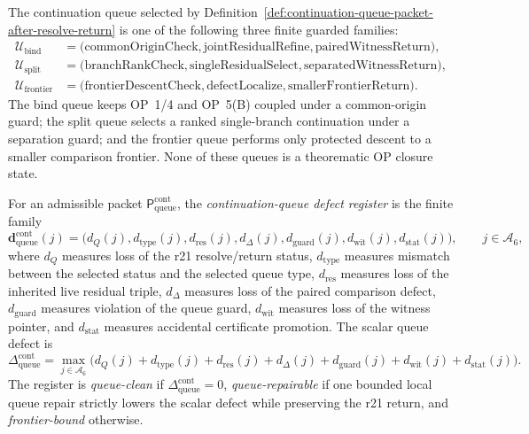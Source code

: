 \begin{definition}
\label{def:bind-split-frontier-continuation-queues}
The continuation queue selected by Definition~\ref{def:continuation-queue-packet-after-resolve-return} is one of the following three finite guarded families:
\[
\begin{aligned}
  \mathcal U_{\mathrm{bind}}
  &=
  \bigl(
    \mathrm{commonOriginCheck},
    \mathrm{jointResidualRefine},
    \mathrm{pairedWitnessReturn}
  \bigr),\\
  \mathcal U_{\mathrm{split}}
  &=
  \bigl(
    \mathrm{branchRankCheck},
    \mathrm{singleResidualSelect},
    \mathrm{separatedWitnessReturn}
  \bigr),\\
  \mathcal U_{\mathrm{frontier}}
  &=
  \bigl(
    \mathrm{frontierDescentCheck},
    \mathrm{defectLocalize},
    \mathrm{smallerFrontierReturn}
  \bigr).
\end{aligned}
\]
The bind queue keeps OP~1/4 and OP~5(B) coupled under a common-origin guard; the split queue selects a ranked single-branch continuation under a separation guard; and the frontier queue performs only protected descent to a smaller comparison frontier.  None of these queues is a theorematic OP closure state.
\end{definition}

\begin{definition}
\label{def:continuation-queue-defect-register}
For an admissible packet \(\mathsf P_{\mathrm{queue}}^{\mathrm{cont}}\), the \emph{continuation-queue defect register} is the finite family
\[
  \mathbf d_{\mathrm{queue}}^{\mathrm{cont}}(j)
  =
  \bigl(d_{Q}(j),d_{\mathrm{type}}(j),d_{\mathrm{res}}(j),
        d_{\Delta}(j),d_{\mathrm{guard}}(j),d_{\mathrm{wit}}(j),d_{\mathrm{stat}}(j)\bigr),
  \qquad j\in\mathcal A_6,
\]
where \(d_Q\) measures loss of the r21 resolve/return status, \(d_{\mathrm{type}}\) measures mismatch between the selected status and the selected queue type, \(d_{\mathrm{res}}\) measures loss of the inherited live residual triple, \(d_{\Delta}\) measures loss of the paired comparison defect, \(d_{\mathrm{guard}}\) measures violation of the queue guard, \(d_{\mathrm{wit}}\) measures loss of the witness pointer, and \(d_{\mathrm{stat}}\) measures accidental certificate promotion.  The scalar queue defect is
\[
  \Delta_{\mathrm{queue}}^{\mathrm{cont}}
  =
  \max_{j\in\mathcal A_6}
  \bigl(d_Q(j)+d_{\mathrm{type}}(j)+d_{\mathrm{res}}(j)+d_{\Delta}(j)
        +d_{\mathrm{guard}}(j)+d_{\mathrm{wit}}(j)+d_{\mathrm{stat}}(j)\bigr).
\]
The register is \emph{queue-clean} if \(\Delta_{\mathrm{queue}}^{\mathrm{cont}}=0\), \emph{queue-repairable} if one bounded local queue repair strictly lowers the scalar defect while preserving the r21 return, and \emph{frontier-bound} otherwise.
\end{definition}

